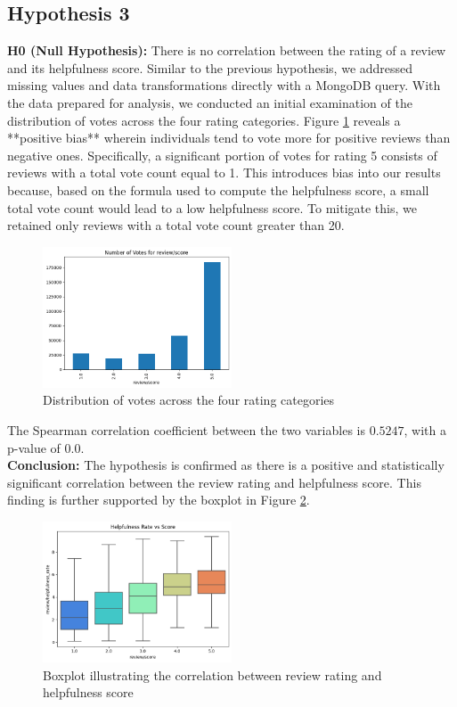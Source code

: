 \subsection*{Hypothesis 3}

\textbf{H0 (Null Hypothesis):} There is no correlation between the rating of a review and its helpfulness score.
\noindent
Similar to the previous hypothesis, we addressed missing values and data transformations directly with a MongoDB query. 
With the data prepared for analysis, we conducted an initial examination of the distribution of votes across the four rating 
categories. Figure \ref{fig:h3_votes_distribution} reveals a **positive bias** wherein individuals tend to vote more for 
positive reviews than negative ones. Specifically, a significant portion of votes for rating 5 consists of reviews with a 
total vote count equal to 1. This introduces bias into our results because, based on the formula used to compute the 
helpfulness score, a small total vote count would lead to a low helpfulness score. To mitigate this, we retained only 
reviews with a total vote count greater than 20.

\begin{figure}[H]
    \centering
    \includegraphics[width=0.5\textwidth]{./figures/h3_votes_distribution.png}
    \caption{Distribution of votes across the four rating categories}
    \label{fig:h3_votes_distribution}
\end{figure}

\noindent
The Spearman correlation coefficient between the two variables is $0.5247$, with a p-value of $0.0$.\\
\textbf{Conclusion:}
The hypothesis is confirmed as there is a positive and statistically significant correlation between the review rating 
and helpfulness score. This finding is further supported by the boxplot in Figure \ref{fig:h3_boxplot}.

\begin{figure}[H]
    \centering
    \includegraphics[width=0.5\textwidth]{./figures/h3_boxplot.png}
    \caption{Boxplot illustrating the correlation between review rating and helpfulness score}
    \label{fig:h3_boxplot}
\end{figure}

